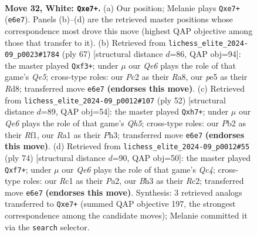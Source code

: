 \documentclass[11pt]{article}
\begin{document}
\clearpage

\begin{figure}[p]\centering
\begin{subfigure}{0.46\textwidth}\centering
\resizebox{\linewidth}{!}{%
\newchessgame
\chessboard[
  setfen={r3k2r/4q1bp/p1npQ1p1/4p1P1/1p2P2P/5P1B/PPPK1B2/R1R5 w - - 1 32},
  showmover=false,
  pgfstyle=straightmove, color=movearrow, markmove={e6-e7}
]}
\caption{}
\end{subfigure}\hfill
\begin{subfigure}{0.46\textwidth}\centering
\resizebox{\linewidth}{!}{%
\newchessgame
\chessboard[
  setfen={r2r2k1/1p2ppb1/6pp/1PPpP3/3Pq3/5QP1/1B3RKP/2R5 b - - 6 34},
  showmover=false,
  pgfstyle=straightmove, color=movearrow, markmove={e4-f3}
]}
\caption{}
\end{subfigure}
\\[4pt]
\begin{subfigure}{0.46\textwidth}\centering
\resizebox{\linewidth}{!}{%
\newchessgame
\chessboard[
  setfen={1r3r1k/1p5q/pBnppp2/4b2Q/2P1P1B1/1P5P/P5P1/2R2RK1 w - - 0 27},
  showmover=false,
  pgfstyle=straightmove, color=movearrow, markmove={h5-h7}
]}
\caption{}
\end{subfigure}\hfill
\begin{subfigure}{0.46\textwidth}\centering
\resizebox{\linewidth}{!}{%
\newchessgame
\chessboard[
  setfen={2r3k1/2p1rqp1/3p2pb/p7/2QPpPPP/1P2B3/P1R3K1/2R5 w - - 2 38},
  showmover=false,
  pgfstyle=straightmove, color=movearrow, markmove={c4-f7}
]}
\caption{}
\end{subfigure}
\caption{\textbf{Move 32, White: \texttt{Qxe7+}.} (a) Our position; Melanie plays \texttt{Qxe7+} (\texttt{e6e7}). Panels (b)--(d) are the retrieved master positions whose correspondence most drove this move (highest QAP objective among those that transfer to it). (b) Retrieved from \texttt{lichess\_elite\_2024-09\_p0023\#1784} (ply 67) [structural distance $d$=86, QAP obj=94]: the master played \texttt{Qxf3+}; under $\mu$ our \emph{Qe6} plays the role of that game's \emph{Qe5}; cross-type roles: our \emph{P}c2 as their \emph{R}a8, our \emph{p}e5 as their \emph{R}d8; transferred move \texttt{e6e7} \textbf{(endorses this move)}. (c) Retrieved from \texttt{lichess\_elite\_2024-09\_p0012\#107} (ply 52) [structural distance $d$=89, QAP obj=54]: the master played \texttt{Qxh7+}; under $\mu$ our \emph{Qe6} plays the role of that game's \emph{Qh5}; cross-type roles: our \emph{P}b2 as their \emph{R}f1, our \emph{R}a1 as their \emph{P}h3; transferred move \texttt{e6e7} \textbf{(endorses this move)}. (d) Retrieved from \texttt{lichess\_elite\_2024-09\_p0012\#55} (ply 74) [structural distance $d$=90, QAP obj=50]: the master played \texttt{Qxf7+}; under $\mu$ our \emph{Qe6} plays the role of that game's \emph{Qc4}; cross-type roles: our \emph{R}c1 as their \emph{P}a2, our \emph{B}h3 as their \emph{R}c2; transferred move \texttt{e6e7} \textbf{(endorses this move)}. Synthesis: 3 retrieved analogs transferred to \texttt{Qxe7+} (summed QAP objective 197, the strongest correspondence among the candidate moves); Melanie committed it via the \texttt{search} selector.}
\label{fig:thought-m62}
\end{figure}
\end{document}
